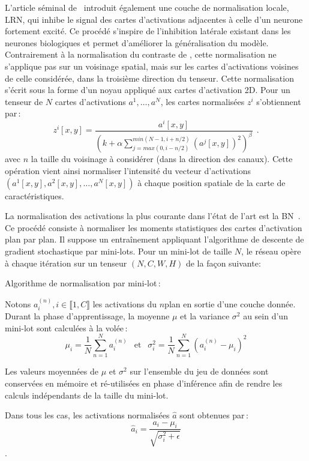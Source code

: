 L'article séminal de~\citet{krizhevsky_imagenet_2012} introduit également une couche de normalisation locale, \gls{LRN}, qui inhibe le signal des cartes d'activations adjacentes à celle d'un neurone fortement excité. Ce procédé s'inspire de l'inhibition latérale existant dans les neurones biologiques et permet d'améliorer la généralisation du modèle. Contrairement à la normalisation du contraste de \citet{jarrett_what_2009}, cette normalisation ne s'applique pas sur un voisinage spatial, mais sur les cartes d'activations voisines de celle considérée, dans la troisième direction du tenseur. Cette normalisation s'écrit sous la forme d'un noyau appliqué aux cartes d'activation 2D. Pour un tenseur de $N$ cartes d'activations $a^1,\dots,a^N$, les cartes normalisées $z^i$ s'obtiennent par\,:
$$z^i[x,y] = \frac{a^i[x,y]}{\left(k + \alpha \sum_{j=max(0, i-n/2)}^{min(N-1, i+n/2)} (a^j[x,y])^2  \right)^\beta}~~.$$
avec $n$ la taille du voisinage à considérer (dans la direction des canaux). Cette opération vient ainsi normaliser l'intensité du vecteur d'activations $(a^1[x,y], a^2[x,y], \dots, a^N[x,y])$ à chaque position spatiale de la carte de caractéristiques.

La normalisation des activations la plus courante dans l'état de l'art est la \gls{BN}~\cite{ioffe_batch_2015}. Ce procédé consiste à normaliser les moments statistiques des cartes d'activation plan par plan. Il suppose un entraînement appliquant l'algorithme de descente de gradient stochastique par mini-lots. Pour un mini-lot de taille $N$, le réseau opère à chaque itération sur un tenseur $(N, C, W, H)$ de la façon suivante:
\begin{definition}
Algorithme de normalisation par mini-lot\,:

Notons $a^{(n)}_i, i \in \llbracket 1,C \rrbracket$ les activations du $n$\ieme plan en sortie d'une couche donnée. Durant la phase d'apprentissage, la moyenne $\mu$ et la variance $\sigma^2$ au sein d'un mini-lot sont calculées à la volée\,:
$$\mu_i = \frac{1}{N} \sum_{n=1}^N a_i^{(n)}~~\text{ et }~~\sigma^2_i = \frac{1}{N} \sum_{n=1}^N (a_i^{(n)} - \mu_i)^2$$

Les valeurs moyennées de $\mu$ et $\sigma^2$ sur l'ensemble du jeu de données sont conservées en mémoire et ré-utilisées en phase d'inférence afin de rendre les calculs indépendants de la taille du mini-lot.

Dans tous les cas, les activations normalisées $\hat{a}$ sont obtenues par\,:
$$\hat{a}_i = \frac{a_i - \mu_i}{\sqrt{\sigma_i^2 + \epsilon}}$$.
\end{definition}

